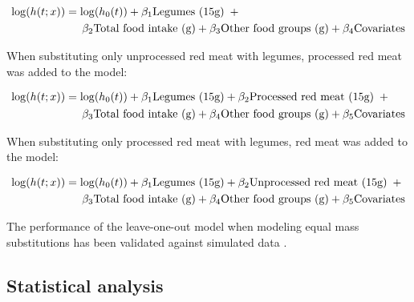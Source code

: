 \documentclass[nutrients,article,submit,moreauthors,pdftex]{Definitions/mdpi}
\begin{document}
\begin{align}
\log(h(t;x)) &= \log(h_0(t)) + \beta_1 \text{Legumes (15g)} \hspace{0.5em} + \nonumber \\
&\quad \hspace{0.5em} \beta_2 \text{Total food intake (g)} + \beta_3 \text{Other food groups (g)} + \beta_4 \text{Covariates}
\end{align}

\noindent When substituting only unprocessed red meat with legumes,
processed red meat was added to the model:

\begin{align}
\log(h(t;x)) &= \log(h_0(t)) + \beta_1 \text{Legumes (15g)} + \beta_2 \text{Processed red meat (15g)} \hspace{0.5em} + \nonumber \\
&\quad \hspace{0.5em} \beta_3 \text{Total food intake (g)} + \beta_4 \text{Other food groups (g)} + \beta_5 \text{Covariates}
\end{align}

\noindent When substituting only processed red meat with legumes, red
meat was added to the model:

\begin{align}
\log(h(t;x)) &= \log(h_0(t)) + \beta_1 \text{Legumes (15g)} + \beta_2 \text{Unprocessed red meat (15g)} \hspace{0.5em} + \nonumber \\
&\quad \hspace{0.5em} \beta_3 \text{Total food intake (g)}  + \beta_4 \text{Other food groups (g)} + \beta_5 \text{Covariates}
\end{align}

\noindent The performance of the leave-one-out model when modeling equal
mass substitutions has been validated against simulated data
\citep{Tomova2022}.

\hypertarget{subsec6}{%
\subsection{Statistical analysis}\label{subsec6}}
\end{document}
